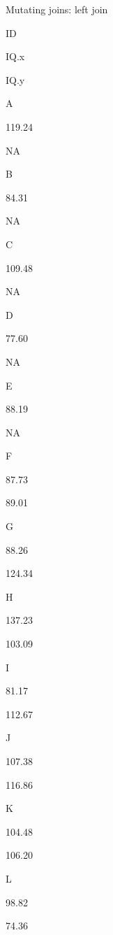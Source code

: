 \documentclass[ignorenonframetext,]{beamer}
\newenvironment{Shaded}{\begin{snugshade}}{\end{snugshade}}
\newcommand{\KeywordTok}[1]{\textcolor[rgb]{0.13,0.29,0.53}{\textbf{#1}}}
\newcommand{\DataTypeTok}[1]{\textcolor[rgb]{0.13,0.29,0.53}{#1}}
\newcommand{\DecValTok}[1]{\textcolor[rgb]{0.00,0.00,0.81}{#1}}
\newcommand{\StringTok}[1]{\textcolor[rgb]{0.31,0.60,0.02}{#1}}
\newcommand{\OperatorTok}[1]{\textcolor[rgb]{0.81,0.36,0.00}{\textbf{#1}}}
\newcommand{\NormalTok}[1]{#1}
\begin{document}
\begin{frame}[fragile]{Mutating joins: left join}

\begin{Shaded}
\end{Shaded}

ID

IQ.x

IQ.y

A

119.24

NA

B

84.31

NA

C

109.48

NA

D

77.60

NA

E

88.19

NA

F

87.73

89.01

G

88.26

124.34

H

137.23

103.09

I

81.17

112.67

J

107.38

116.86

K

104.48

106.20

L

98.82

74.36

\end{frame}
\end{document}
